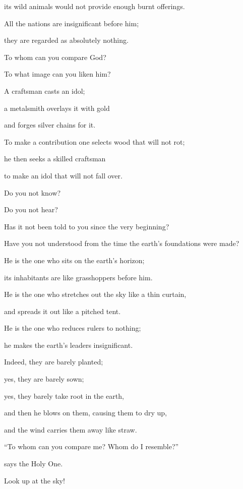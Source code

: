 {\par }{\Q its
wild animals
would not
provide enough
burnt offerings.
\par }{\Q {}All
the nations
are insignificant
before
him;
\par }{\Q they are regarded as
absolutely
nothing.
\par }{\Q {}To
whom
can you compare
God?
\par }{\Q To what
image
can you liken him?
\par }{\Q {}A craftsman
casts
an idol;
\par }{\Q a metalsmith
overlays
it with gold
\par }{\Q and forges
silver
chains for it.
\par }{\Q {}To make a contribution
one selects
wood
that will not
rot;
\par }{\Q he then seeks
a skilled
craftsman
\par }{\Q to make
an idol
that will not
fall over.
\par }{\Q {}Do you not
know?
\par }{\Q Do you not
hear?
\par }{\Q Has it not
been told
to you since the very beginning?
\par }{\Q Have you not
understood
from the time the earth’s
foundations were made?
\par }{\Q {}He is the one who sits
on
the earth’s
horizon;
\par }{\Q its inhabitants
are like grasshoppers
before him.

\par }{\Q He
is the one who stretches out
the sky
like a thin curtain,
\par }{\Q and spreads
it out like a pitched
tent.
\par }{\Q {}He is
the one
who reduces
rulers
to nothing;
\par }{\Q he makes the earth’s
leaders insignificant.
\par }{\Q {}Indeed,
they are barely
planted;
\par }{\Q yes,
they are barely
sown;
\par }{\Q yes,
they barely
take root
in the earth,
\par }{\Q and then
he blows on
them, causing them to dry up,
\par }{\Q and the wind
carries
them away
like straw.
\par }{\Q {}“To whom
can you compare
me? Whom do I resemble?”
\par }{\Q says
the Holy One.
\par }{\Q {}Look up
at the sky!

}
